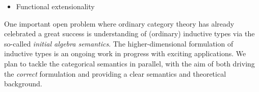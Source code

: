 

\begin{itemize}
\item Functional extensionality
\end{itemize}


One important open problem where ordinary category
theory has already celebrated a great success is understanding of
(ordinary) inductive types via the so-called \emph{initial algebra
  semantics}. The higher-dimensional formulation of inductive types is
an ongoing work in progress \cite{} with exciting
applications\cite{}. We plan to tackle the categorical semantics in
parallel, with the aim of both driving the \emph{correct} formulation
and providing a clear semantics and theoretical background.




